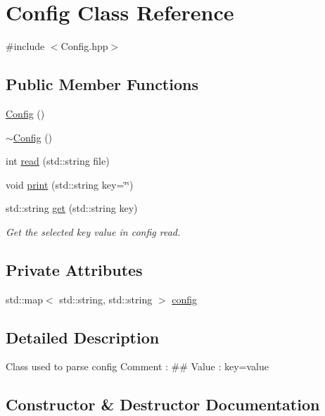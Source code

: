 \hypertarget{classConfig}{}\section{Config Class Reference}
\label{classConfig}


{\ttfamily \#include $<$Config.\+hpp$>$}

\subsection*{Public Member Functions}
\begin{DoxyCompactItemize}
\item 
\mbox{\hyperlink{classConfig_abd0c571c116924871e30444b192b792a}{Config}} ()
\item 
\mbox{\hyperlink{classConfig_a543dce59b66475c5108088ee4ce1cdfc}{$\sim$\+Config}} ()
\item 
int \mbox{\hyperlink{classConfig_a884554353ee78b567bf7870cd513a014}{read}} (std\+::string file)
\item 
void \mbox{\hyperlink{classConfig_a50f1975553317a337740bec3ea316f10}{print}} (std\+::string key=\char`\"{}\char`\"{})
\item 
std\+::string \mbox{\hyperlink{classConfig_a3c55d333e4f503cf0de93e6e4e229592}{get}} (std\+::string key)
\begin{DoxyCompactList}\small\item\em Get the selected key value in config read. \end{DoxyCompactList}\end{DoxyCompactItemize}
\subsection*{Private Attributes}
\begin{DoxyCompactItemize}
\item 
std\+::map$<$ std\+::string, std\+::string $>$ \mbox{\hyperlink{classConfig_ae490b81bf10ac9ac10f12fe35d4474a0}{config}}
\end{DoxyCompactItemize}


\subsection{Detailed Description}
Class used to parse config Comment \+: \#\# Value \+: key=value 

\subsection{Constructor \& Destructor Documentation}
\mbox{\label{classConfig_abd0c571c116924871e30444b192b792a}} 

